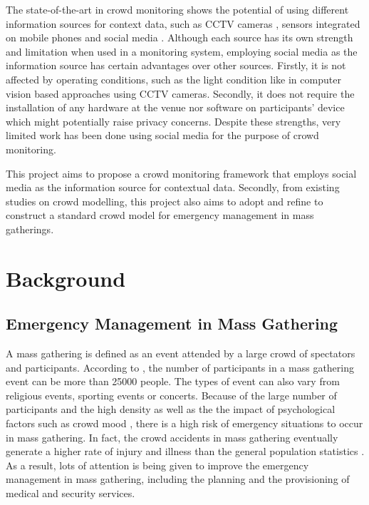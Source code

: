 The state-of-the-art in crowd monitoring shows the potential of using different information sources for context data, such as CCTV cameras \citep{Davies1995}, sensors integrated on mobile phones \citep{Wirz2013} and social media \citep{DelirHaghighi2013}. Although each source has its own strength and limitation when used in a monitoring system, employing social media as the information source has certain advantages over other sources. Firstly, it is not affected by operating conditions, such as the light condition like in computer vision based approaches using CCTV cameras. Secondly, it does not require the installation of any hardware at the venue nor software on participants' device which might potentially raise privacy concerns. Despite these strengths, very limited work has been done using social media for the purpose of crowd monitoring.

This project aims to propose a crowd monitoring framework that employs social media as the information source for contextual data. Secondly, from existing studies on crowd modelling, this project also aims to adopt and refine to construct a standard crowd model for emergency management in mass gatherings.

\section{Background}

\subsection{Emergency Management in Mass Gathering}

A mass gathering is defined as an event attended by a large crowd of spectators and participants. According to \citep{Arbon2007}, the number of participants in a mass gathering event can be more than 25000 people. The types of event can also vary from religious events, sporting events or concerts. Because of the large number of participants and the high density as well as the the impact of psychological factors such as crowd mood \citep{Arbon2004}, there is a high risk of emergency situations to occur in mass gathering. In fact, the crowd accidents in mass gathering eventually generate a higher rate of injury and illness than the general population statistics \citep{Arbon2007}. As a result, lots of attention is being given to improve the emergency management in mass gathering, including the planning and the provisioning of medical and security services. 

